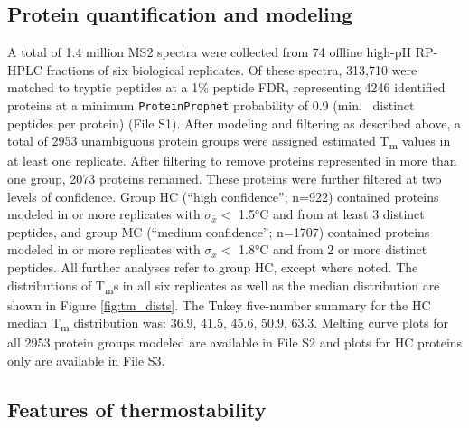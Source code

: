 \documentclass[11pt,letter]{article}\usepackage[]{graphicx}\usepackage[]{color}
\newcommand{\Tm}{T\textsubscript{m}}
\newcommand{\sw}[1]{\texttt{#1}}
\newcommand{\sem}{\sigma_{\bar{x}}}
\newcommand{\celsius}[1]{#1°C}
\begin{document}
\subsection*{Protein quantification and modeling}

A total of 1.4 million MS2 spectra were collected from 74 offline high-pH
RP-HPLC fractions of six biological replicates. Of these spectra, 313,710 were
matched to tryptic peptides at a 1\% peptide FDR, representing
4246 identified proteins at a minimum \sw{ProteinProphet}
probability of 0.9 (min.\
 distinct peptides per protein) (File
S1). After modeling and filtering as described
above, a total of 2953 unambiguous protein groups were assigned
estimated \Tm{} values in at least one replicate. After filtering to remove
proteins represented in more than one group, 2073 proteins
remained. These proteins were further filtered at two levels of confidence.
Group HC (``high confidence''; n=922) contained proteins modeled
in \numberstringnum{3} or more replicates with $\sem <$
\celsius{1.5} and from at least 3 distinct
peptides, and group MC (``medium confidence''; n=1707) contained
proteins modeled in \numberstringnum{2} or more replicates with
$\sem <$ \celsius{1.8} and from 2 or more distinct
peptides. All further analyses refer to group HC, except where
noted. The distributions of \Tm{}s in all six replicates as well as the median
distribution are shown in Figure \ref{fig:tm_dists}. The Tukey five-number
summary for the HC median \Tm{} distribution was:
36.9, 41.5, 45.6, 50.9, 63.3. Melting curve plots
for all 2953 protein groups modeled are available in File
S2 and plots for HC proteins
only are available in File S3.

\subsection*{Features of thermostability}
\end{document}
